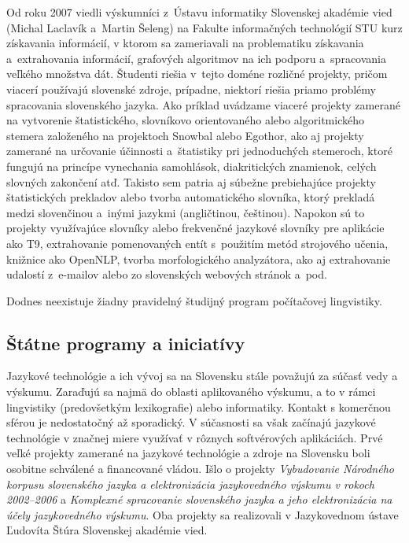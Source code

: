 \begin{multicols}{2}
Od roku 2007 viedli výskumníci z~Ústavu informatiky Slovenskej akadémie vied (Michal Laclavík a~Martin Šeleng) na Fakulte informačných technológií STU kurz získavania informácií, v ktorom sa zameriavali na problematiku získavania a~extrahovania informácií\cite{f30}, grafových algoritmov na ich podporu a~spracovania veľkého množstva dát. Študenti riešia v~tejto doméne rozličné projekty, pričom viacerí používajú slovenské zdroje, prípadne, niektorí riešia priamo problémy spracovania slovenského jazyka. Ako príklad uvádzame viaceré projekty zamerané na vytvorenie štatistického, slovníkovo orientovaného alebo algoritmického stemera založeného na projektoch Snowbal alebo Egothor, ako aj projekty zamerané na určovanie účinnosti a~štatistiky pri jednoduchých stemeroch, ktoré fungujú na princípe vynechania samohlások, diakritických znamienok, celých slovných zakončení atď. Takisto sem patria aj súbežne prebiehajúce projekty štatistických prekladov alebo tvorba automatického slovníka, ktorý prekladá medzi slovenčinou a~inými jazykmi (angličtinou, češtinou). Napokon sú to projekty využívajúce slovníky alebo frekvenčné jazykové slovníky pre aplikácie ako T9, extrahovanie pomenovaných entít s~použitím metód strojového učenia, knižnice ako OpenNLP, tvorba morfologického analyzátora, ako aj extrahovanie udalostí z~e-mailov alebo zo slovenských webových stránok a~pod.

Dodnes neexistuje žiadny pravidelný študijný program počítačovej lingvistiky.

\subsection{Štátne programy a iniciatívy}
Jazykové technológie a ich vývoj sa na Slovensku stále považujú za súčasť vedy a výskumu. Zaraďujú sa najmä do oblasti aplikovaného výskumu, a to v rámci lingvistiky (predovšetkým lexikografie) alebo informatiky. Kontakt s komerčnou sférou je nedostatočný až sporadický. V súčasnosti sa však začínajú jazykové technológie v značnej miere využívať v rôznych softvérových aplikáciách.
Prvé veľké projekty zamerané na jazykové technológie a zdroje na Slovensku boli osobitne schválené a financované vládou. Išlo o projekty \emph{Vybudovanie Národného korpusu slovenského jazyka a elektronizácia jazykovedného výskumu v rokoch 2002--2006} a \emph{Komplexné spracovanie slovenského jazyka a jeho elektronizácia na účely jazykovedného výskumu}. Oba projekty sa realizovali v Jazykovednom ústave Ľudovíta Štúra Slovenskej akadémie vied.


\end{multicols}
